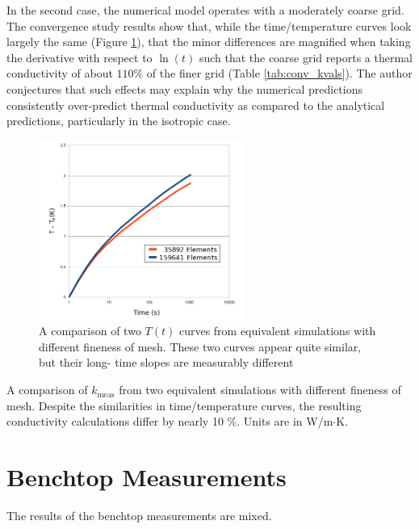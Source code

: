 In the second case, the numerical model operates with a moderately coarse grid.
The convergence study results show that, while the time/temperature curves look
largely the same (Figure \ref{fig:conv_curves}), that the minor differences are magnified when taking the
derivative with respect to \(\ln(t)\) such that the coarse grid reports a
thermal conductivity of about \(110\%\) of the finer grid (Table \ref{tab:conv_kvals}). The author
conjectures that such effects may explain why the numerical predictions
consistently over-predict thermal conductivity as compared to the analytical
predictions, particularly in the isotropic case.


\begin{figure}[h]
\centering
\includegraphics[width=0.6\textwidth]{fig/conv_curves.png}
\caption{A comparison of two \(T(t)\) curves from equivalent simulations with 
different fineness of mesh. These two curves appear quite similar, but their long-
time slopes are measurably different}
\label{fig:conv_curves}
\end{figure}


\begin{table}[h]
\centering

\caption{A comparison of \(k_{\textrm{meas}}\) from two equivalent simulations 
with different fineness of mesh. Despite the similarities in time/temperature
curves, the resulting  conductivity calculations differ by nearly 10 \%. Units are in W\(/\)m\(\cdot\)K.}
\label{tab:conv_kvals}
\end{table}

\section{Benchtop Measurements}

The results of the benchtop measurements are mixed.

